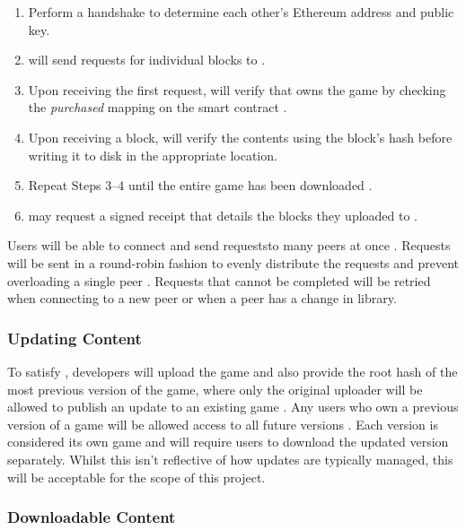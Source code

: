 \begin{enumerate}
  \item Perform a handshake to determine each other's Ethereum address and public key.
  \item \downloader will send requests for individual blocks to \seeder {}.
  \item Upon receiving the first request, \seeder will verify that \downloader owns the game by checking the \textit{purchased} mapping on the smart contract  .
  \item Upon receiving a block, \downloader will verify the contents using the block's hash  before writing it to disk in the appropriate location.
  \item Repeat Steps 3--4 until the entire game has been downloaded .
  \item \seeder may request a signed receipt that details the blocks they uploaded  to \downloader.
\end{enumerate}

\newparagraph
Users will be able to connect and send requeststo many peers at once . Requests will be sent in a round-robin fashion to evenly distribute the requests and prevent overloading a single peer . Requests that cannot be completed will be retried when connecting to a new peer or when a peer has a change in library.

\subsubsection*{Updating Content}\label{subsubsec:updating}

To satisfy , developers will upload the game and also provide the root hash of the most previous version of the game, where only the original uploader will be allowed to publish an update to an existing game . Any users who own a previous version of a game will be allowed access to all future versions .
\x
Each version is considered its own game and will require users to download the updated version separately. Whilst this isn't reflective of how updates are typically managed, this will be acceptable for the scope of this project.

\subsubsection*{Downloadable Content}

